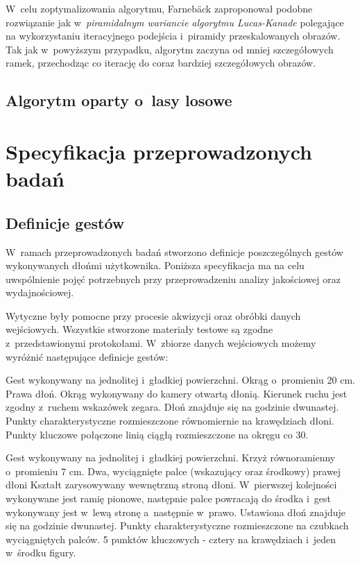     W~celu zoptymalizowania algorytmu, Farnebäck zaproponował podobne rozwiązanie jak w~\textit{piramidalnym wariancie algorytmu Lucas-Kanade} polegające na wykorzystaniu iteracyjnego podejścia i~piramidy przeskalowanych obrazów. Tak jak w~powyższym przypadku, algorytm zaczyna od mniej szczegółowych ramek, przechodząc co iterację do coraz bardziej szczegółowych obrazów.

  \section{Algorytm oparty o~lasy losowe}\label{Subsection_RandomizedTrees}
    \cite{RandomizedTrees06}
    \cite{TwoStageRandomizedTrees11}
    \cite{RealTimeRandomizedTrees05}
    \cite{RecognizingFeaturePointsUsingClassificationTrees04}

\chapter{Specyfikacja przeprowadzonych badań}\label{Chapter_SpecyfikacjaPrzeprowadzonychBadan}

  \section{Definicje gestów}\label{Section_DefinicjeGestow}

    W~ramach przeprowadzonych badań stworzono definicje poszczególnych gestów wykonywanych dłońmi użytkownika. Poniższa specyfikacja ma na celu uwspólnienie pojęć potrzebnych przy przeprowadzeniu analizy jakościowej oraz wydajnościowej.

    Wytyczne były pomocne przy procesie akwizycji oraz obróbki danych wejściowych. Wszystkie stworzone materiały testowe są zgodne z~przedstawionymi protokołami. W~zbiorze danych wejściowych możemy wyróżnić następujące definicje gestów:

         {Gest wykonywany na jednolitej i~gładkiej powierzchni.}
         {Okrąg o~promieniu 20 cm.}
         {Prawa dłoń.}
         {Okrąg wykonywany do kamery otwartą dłonią.}
         {Kierunek ruchu jest zgodny z~ruchem wskazówek zegara.}
         {Dłoń znajduje się na godzinie dwunastej.}
         {Punkty charakterystyczne rozmieszczone równomiernie na krawędziach dłoni.}
         {Punkty kluczowe połączone linią ciągłą rozmieszczone na okręgu co 30\degree.}

    \newpage
         {Gest wykonywany na jednolitej i~gładkiej powierzchni.}
         {Krzyż równoramienny o~promieniu 7 cm.}
         {Dwa, wyciągnięte palce (wskazujący oraz środkowy) prawej dłoni}
         {Kształt zarysowywany wewnętrzną stroną dłoni.}
         {W~pierwszej kolejności wykonywane jest ramię pionowe, następnie palce powracają do środka i~gest wykonywany jest w~lewą stronę a~następnie w~prawo.}
         {Ustawiona dłoń znajduje się na godzinie dwunastej.}
         {Punkty charakterystyczne rozmieszczone na czubkach wyciągniętych palców.}
         {5 punktów kluczowych - cztery na krawędziach i~jeden w~środku figury.}

